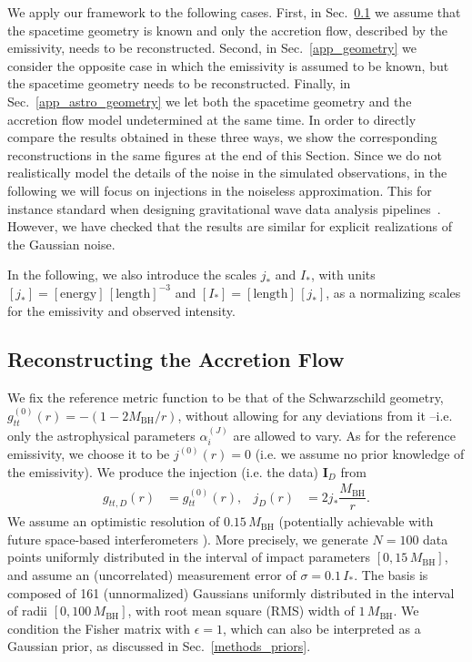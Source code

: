 \documentclass[%
nofootinbib,
 amsmath,amssymb,
 aps,
floatfix,
twocolumn
]{revtex4-2}
\begin{document}
We apply our framework to the following cases. First, in Sec.~\ref{app_astro} we assume that the spacetime geometry is known and only the accretion flow, described by the emissivity, needs to be reconstructed. Second, in Sec.~\ref{app_geometry} we consider the opposite case in which the emissivity is assumed to be known, but the spacetime geometry needs to be reconstructed. Finally, in Sec.~\ref{app_astro_geometry} we let both the spacetime geometry and the accretion flow model undetermined  at the same time. In order to directly compare the results obtained in these three ways, we show the corresponding reconstructions in the same figures at the end of this Section.
%
Since we do not realistically model the details of the noise in the simulated observations, in the following we will focus on injections in the noiseless approximation. This for instance standard when designing gravitational wave data analysis pipelines~\cite{Rodriguez:2013oaa}.
%
However, we have checked that the results are similar for explicit realizations of the Gaussian noise.

In the following, we also introduce the scales \(j_{*}\) and \(I_{*}\), with units 
%
\( [j_{*}] = [\text{energy}] \, [\text{length}]^{-3} \) and
\([I_{*}] = [\text{length}] \, [j_{*}]\),
%
as a normalizing scales for the emissivity and observed intensity. 

\subsection{Reconstructing the Accretion Flow}\label{app_astro}


We fix the reference metric function 
to be that of the Schwarzschild geometry,  \(g^{(0)}_{tt}(r) = - ( 1 - 2 M_\text{BH} / r ) \), without allowing for any deviations from it --i.e. only the astrophysical parameters \(\alpha^{(J)}_{i}\) are allowed to vary. As for the reference emissivity, we choose it to be \( j^{(0)}(r) = 0\) (i.e. we assume no prior knowledge of the emissivity). 
%
We produce the injection (i.e. the data) \(\boldsymbol{I}_D\) from
%
%
\begin{align} \label{eq: Injection1}
    g_{tt,D}(r) &= g^{(0)}_{tt} (r) , &
    j_{D}(r) &= 2  j_{*}\dfrac{M_\text{BH}}{r}.
\end{align}
%
%
We assume an optimistic resolution of \(0.15\, M_\text{BH}\) (potentially achievable with future space-based interferometers \cite{Johnson_2020}). More precisely, we generate
 \(N = 100\) data points uniformly distributed in the interval of impact parameters \([0, 15\,M_\text{BH}]\), 
%
and assume an (uncorrelated) measurement error of \(\sigma = 0.1 \, I_{*}\). 
The basis is composed of 161 (unnormalized) Gaussians uniformly distributed in the interval of radii \([0, 100\, M_\text{BH}]\), with root mean square (RMS) width of \(1 \, M_\text{BH}\). 
We condition the Fisher matrix with \(\epsilon = 1\), which can also be interpreted as a Gaussian prior, as discussed in Sec.~\ref{methods_priors}.
\end{document}
